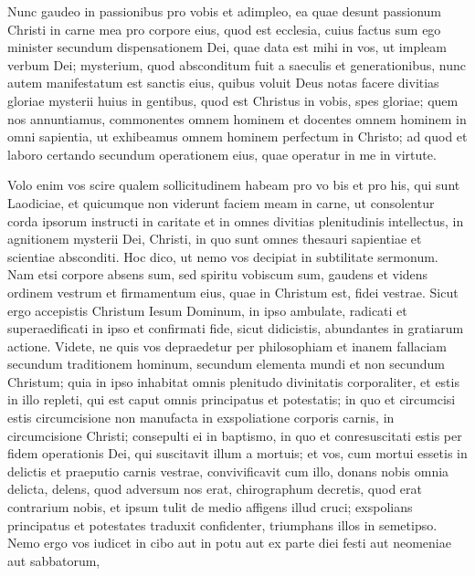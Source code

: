 \begin{biblechapter}
\verse Nunc gaudeo in passionibus pro vobis et adimpleo, ea quae desunt passionum Christi in carne mea pro corpore eius, quod est ecclesia, 
\verse cuius factus sum ego minister secundum dispensationem Dei, quae data est mihi in vos, ut impleam verbum Dei; 
\verse mysterium, quod absconditum fuit a saeculis et generationibus, nunc autem manifestatum est sanctis eius, 
\verse quibus voluit Deus notas facere divitias gloriae mysterii huius in gentibus, quod est Christus in vobis, spes gloriae; 
\verse quem nos annuntiamus, commonentes omnem hominem et docentes omnem hominem in omni sapientia, ut exhibeamus omnem hominem perfectum in Christo; 
\verse ad quod et laboro certando secundum operationem eius, quae operatur in me in virtute. 
\end{biblechapter}

\begin{biblechapter}  
\verse Volo enim vos scire qualem sollicitudinem habeam pro vo bis et pro his, qui sunt Laodiciae, et quicumque non viderunt faciem meam in carne, 
\verse ut consolentur corda ipsorum instructi in caritate et in omnes divitias plenitudinis intellectus, in agnitionem mysterii Dei, Christi, 
\verse in quo sunt omnes thesauri sapientiae et scientiae absconditi. 
\verse Hoc dico, ut nemo vos decipiat in subtilitate sermonum. 
\verse Nam etsi corpore absens sum, sed spiritu vobiscum sum, gaudens et videns ordinem vestrum et firmamentum eius, quae in Christum est, fidei vestrae. 
\verse Sicut ergo accepistis Christum Iesum Dominum, in ipso ambulate, 
\verse radicati et superaedificati in ipso et confirmati fide, sicut didicistis, abundantes in gratiarum actione. 
\verse Videte, ne quis vos depraedetur per philosophiam et inanem fallaciam secundum traditionem hominum, secundum elementa mundi et non secundum Christum; 
\verse quia in ipso inhabitat omnis plenitudo divinitatis corporaliter, 
\verse et estis in illo repleti, qui est caput omnis principatus et potestatis; 
\verse in quo et circumcisi estis circumcisione non manufacta in exspoliatione corporis carnis, in circumcisione Christi; 
\verse consepulti ei in baptismo, in quo et conresuscitati estis per fidem operationis Dei, qui suscitavit illum a mortuis; 
\verse et vos, cum mortui essetis in delictis et praeputio carnis vestrae, convivificavit cum illo, donans nobis omnia delicta, 
\verse delens, quod adversum nos erat, chirographum decretis, quod erat contrarium nobis, et ipsum tulit de medio affigens illud cruci; 
\verse exspolians principatus et potestates traduxit confidenter, triumphans illos in semetipso. 
\verse Nemo ergo vos iudicet in cibo aut in potu aut ex parte diei festi aut neomeniae aut sabbatorum, 

\end{biblechapter}
